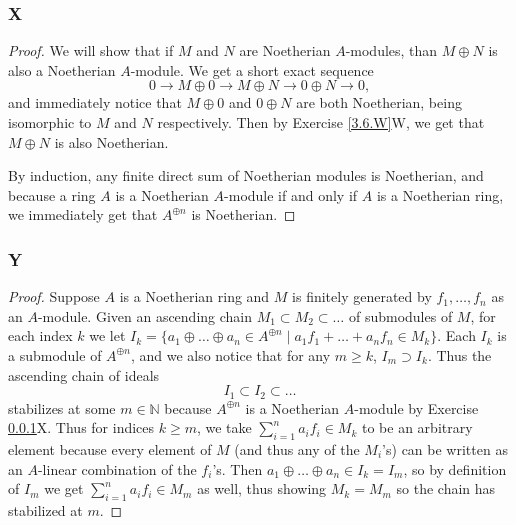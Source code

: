 \documentclass{article}
\newcommand{\N}{\mathbb{N}}
\theoremstyle{definition} %
\begin{document}
\subsubsection{X}\label{3.6.X}
\begin{proof}
    We will show that if $M$ and $N$ are Noetherian $A$-modules, than $M\oplus N$ is also a Noetherian $A$-module. We get a short exact sequence
    \[
    0\to M\oplus 0\to M\oplus N \to 0\oplus N \to 0,
    \]
    and immediately notice that $M\oplus 0$ and $0\oplus N$ are both Noetherian, being isomorphic to $M$ and $N$ respectively. Then by Exercise \ref{3.6.W}W, we get that $M\oplus N$ is also Noetherian.

    By induction, any finite direct sum of Noetherian modules is Noetherian, and because a ring $A$ is a Noetherian $A$-module if and only if $A$ is a Noetherian ring, we immediately get that $A^{\oplus n}$ is Noetherian.
\end{proof}
\subsubsection{Y}\label{3.6.Y}
\begin{proof}
    Suppose $A$ is a Noetherian ring and $M$ is finitely generated by $f_1,\dots, f_n$ as an $A$-module. Given an ascending chain $M_1\subset M_2 \subset \dots$ of submodules of $M$, for each index $k$ we let $I_k = \{a_1\oplus \dots \oplus a_n \in A^{\oplus n} \mid a_1f_1 + \dots + a_n f_n \in M_k \}$. Each $I_k$ is a submodule of $A^{\oplus n}$, and we also notice that for any $m\ge k$, $I_m \supset I_k$. Thus the ascending chain of ideals
    \[
    I_1 \subset I_2 \subset \dots
    \]
    stabilizes at some $m\in \N$ because $A^{\oplus n}$ is a Noetherian $A$-module by Exercise \ref{3.6.X}X. Thus for indices $k\ge m$, we take $\sum_{i=1}^n a_i f_i \in M_k$ to be an arbitrary element because every element of $M$ (and thus any of the $M_i$'s) can be written as an $A$-linear combination of the $f_i$'s. Then $a_1\oplus \dots \oplus a_n \in I_k = I_m$, so by definition of $I_m$ we get $\sum_{i=1}^n a_i f_i \in M_m$ as well, thus showing $M_k= M_m$ so the chain has stabilized at $m$.
\end{proof}
\subsection{}
\end{document}
